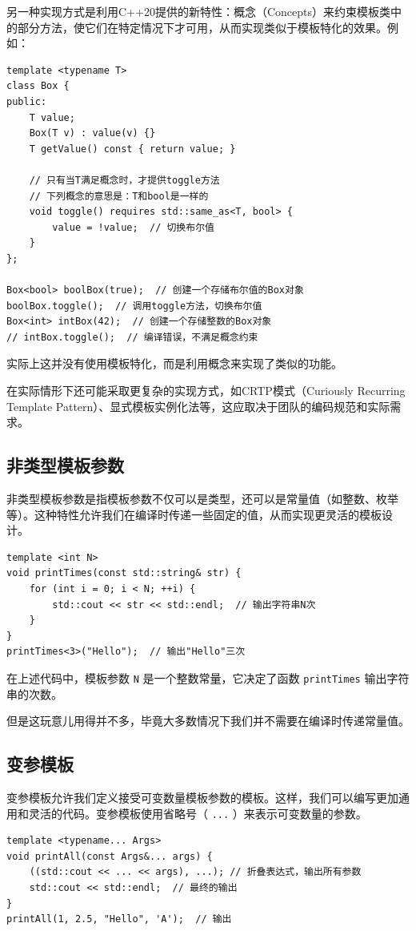 另一种实现方式是利用C++20提供的新特性：概念（Concepts）来约束模板类中的部分方法，使它们在特定情况下才可用，从而实现类似于模板特化的效果。例如：
\begin{verbatim}
template <typename T>
class Box {
public:
    T value;
    Box(T v) : value(v) {}
    T getValue() const { return value; }
    
    // 只有当T满足概念时，才提供toggle方法
    // 下列概念的意思是：T和bool是一样的
    void toggle() requires std::same_as<T, bool> {
        value = !value;  // 切换布尔值
    }
};

Box<bool> boolBox(true);  // 创建一个存储布尔值的Box对象
boolBox.toggle();  // 调用toggle方法，切换布尔值
Box<int> intBox(42);  // 创建一个存储整数的Box对象
// intBox.toggle();  // 编译错误，不满足概念约束
\end{verbatim}
实际上这并没有使用模板特化，而是利用概念来实现了类似的功能。

在实际情形下还可能采取更复杂的实现方式，如CRTP模式（Curiously Recurring Template Pattern）、显式模板实例化法等，这应取决于团队的编码规范和实际需求。

\subsection{非类型模板参数}

非类型模板参数是指模板参数不仅可以是类型，还可以是常量值（如整数、枚举等）。这种特性允许我们在编译时传递一些固定的值，从而实现更灵活的模板设计。
\begin{verbatim}
template <int N>
void printTimes(const std::string& str) {
    for (int i = 0; i < N; ++i) {
        std::cout << str << std::endl;  // 输出字符串N次
    }
}
printTimes<3>("Hello");  // 输出"Hello"三次
\end{verbatim}
在上述代码中，模板参数 \texttt{N} 是一个整数常量，它决定了函数 \texttt{printTimes} 输出字符串的次数。

但是这玩意儿用得并不多，毕竟大多数情况下我们并不需要在编译时传递常量值。

\subsection{变参模板}

变参模板允许我们定义接受可变数量模板参数的模板。这样，我们可以编写更加通用和灵活的代码。变参模板使用省略号（ \texttt{...} ）来表示可变数量的参数。
\begin{verbatim}
template <typename... Args>
void printAll(const Args&... args) {
    ((std::cout << ... << args), ...); // 折叠表达式，输出所有参数
    std::cout << std::endl;  // 最终的输出
}
printAll(1, 2.5, "Hello", 'A');  // 输出
\end{verbatim}


